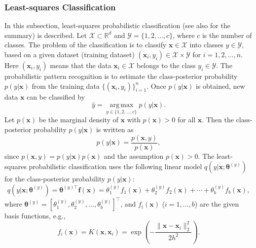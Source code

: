 \subsubsection{{Least-squares Classification}}\label{subsec:least-squares-classification}
{In this subsection, least-squares probabilistic classification  (see also  for the summary) is described.}
{Let $\mathcal{X}\subset\mathbb{R}^d$ and $\mathcal{Y}=\{1,2,\ldots,c\}$, where $c$ is the number of classes. The problem of the classification is to classify $\boldsymbol{x}\in\mathcal{X}$ into classes $y\in\mathcal{Y}$, based on a given dataset (training dataset) $(\boldsymbol{x}_i,y_i)\in\mathcal{X}\times\mathcal{Y}$ for $i=1,2,\ldots,n$. Here $(\boldsymbol{x}_i,y_i)$ means that the data $\boldsymbol{x}_i\in\mathcal{X}$ belongs to the class $y_i\in\mathcal{Y}$.}
{The probabilistic pattern recognition is to estimate the class-posterior probability $p(y|\boldsymbol{x})$ from the training data $\{(\boldsymbol{x}_i,y_i)\}_{i=1}^n$. Once $p(y|\boldsymbol{x})$ is obtained, new data $\boldsymbol{x}$ can be classified by}
\[\widehat y=\operatorname*{arg\,max}_{y\in\{1,2,\ldots,c\}}p(y|\boldsymbol{x}).\]
{Let $p(\boldsymbol{x})$ be the marginal density of $\boldsymbol{x}$ with $p(\boldsymbol{x})>0$ for all $\boldsymbol{x}$. Then the class-posterior probability $p(y|\boldsymbol{x})$ is written as}
\begin{equation}\label{eq:class-posterior-probability}
p(y|\boldsymbol{x})=\frac{p(\boldsymbol{x},y)}{p(\boldsymbol{x})},
\end{equation}
{since $p(\boldsymbol{x},y)=p(y|\boldsymbol{x})p(\boldsymbol{x})$ and the assumption $p(\boldsymbol{x})>0$. The least-squares probabilistic classification uses the following linear model $q(y|\boldsymbol{x};\boldsymbol{\theta}^{(y)})$ for the class-posterior probability $p(y|\boldsymbol{x})$:}
\begin{equation}\label{eq:classification-basis-model}
q(y|\boldsymbol{x};\boldsymbol{\theta}^{(y)})=\boldsymbol{\theta}^{(y)\top}\boldsymbol{f}(\boldsymbol{x})=\theta_1^{(y)}f_1(\boldsymbol{x})+\theta_2^{(y)}f_2(\boldsymbol{x})+\cdots+\theta_b^{(y)}f_b(\boldsymbol{x}),
\end{equation}
{where $\boldsymbol{\theta}^{(y)}=[\theta_1^{(y)},\theta_2^{(y)},\ldots,\theta_b^{(y)}]^{\top}$, and $f_i(\boldsymbol{x})$ ($i=1,\ldots,b$) are the given basis functions, e.g.,}
\begin{equation}\label{eq:classification-gaussian-kernel}
f_i(\boldsymbol{x})=K(\boldsymbol{x},\boldsymbol{x}_i)=\exp\left(-\frac{\|\boldsymbol{x}-\boldsymbol{x}_i\|_2^2}{2h^2}\right).
\end{equation}
